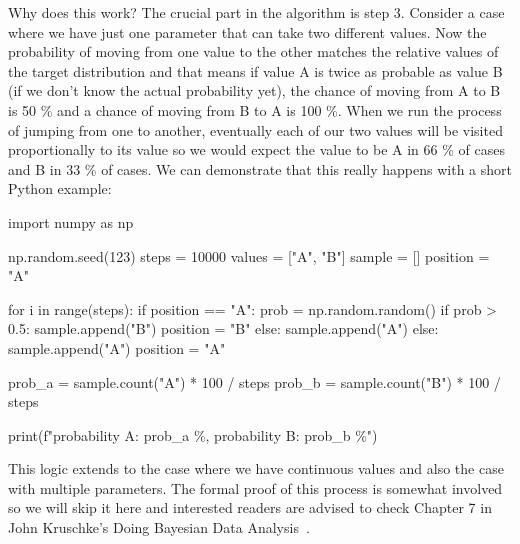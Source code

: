 \documentclass[12pt,a4paper,leqno]{report}
\theoremstyle{plain}
\theoremstyle{definition}
\theoremstyle{remark}
\begin{document}
Why does this work? The crucial part in the algorithm is step 3. Consider a case
where we have just one parameter that can take two different values. Now the probability
of moving from one value to the other matches the relative values of the
target distribution and that means if value A is twice as probable as value B (if we don't know the
actual probability yet), the chance of moving from A to B is 50 \% and a chance of moving
from B to A is 100 \%. When we run the process of jumping from one to another, eventually each of our two values
will be visited proportionally to its value so we would expect the value to be A in 66
\% of cases and B in 33 \% of cases. We can demonstrate that this really happens with a short Python
example:

\begin{pyblock}[][fontsize=\footnotesize]
import numpy as np

np.random.seed(123)
steps = 10000
values = ["A", "B"]
sample = []
position = "A"

for i in range(steps):
    if position == "A":
        prob = np.random.random()
        if prob > 0.5:
            sample.append("B")
            position = "B"
        else:
            sample.append("A")
    else:
        sample.append("A")
        position = "A"

prob_a = sample.count("A") * 100 / steps
prob_b = sample.count("B") * 100 / steps

print(f"probability A: {prob_a} \%, probability B: {prob_b} \%")
\end{pyblock}
\stdoutpythontex
\bigskip

This logic extends to the case where we have
continuous values and also the case with multiple parameters. The formal proof
of this process is somewhat involved so we will skip it here and interested readers are
advised to check Chapter 7 in John Kruschke's Doing Bayesian Data Analysis\ \cite{kruschke}.
\end{document}
